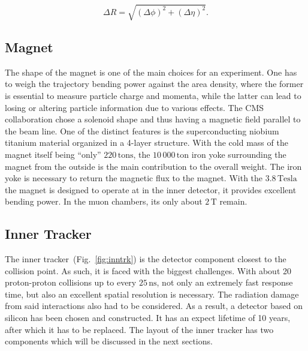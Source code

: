 \begin{equation}
  \label{eq:spatdiff}
  \Delta R = \sqrt{\left(\Delta \phi\right)^2 + \left(\Delta \eta\right)^2}.
\end{equation}

\subsection{Magnet}

The shape of the magnet is one of the main choices for an experiment. One has to weigh the trajectory bending power against the area density, where the former is essential to measure particle charge and momenta, while the latter can lead to losing or altering particle information due to various effects. The CMS collaboration chose a solenoid shape and thus having a magnetic field parallel to the beam line. One of the distinct features is the superconducting niobium titanium material organized in a 4-layer structure. With the cold mass of the magnet itself being ``only'' $220\,\text{tons}$, the $10\,000\,\text{ton}$ iron yoke surrounding the magnet from the outside is the main contribution to the overall weight. The iron yoke is necessary to return the magnetic flux to the magnet. With the $3.8\,\text{Tesla}$ the magnet is designed to operate at in the inner detector, it provides excellent bending power. In the muon chambers, its only about $2\,\text{T}$ remain.

\subsection{Inner Tracker}
\label{sec:innertracker}

The inner tracker~(Fig.~\ref{fig:inntrk}) is the detector component closest to the collision point. As such, it is faced with the biggest challenges. With about 20 proton-proton collisions up to every $25\,\text{ns}$, not only an extremely fast response time, but also an excellent spatial resolution is necessary. The radiation damage from said interactions also had to be considered. As a result, a detector based on silicon has been chosen and constructed. It has an expect lifetime of 10 years, after which it has to be replaced. The layout of the inner tracker has two components which will be discussed in the next sections.

